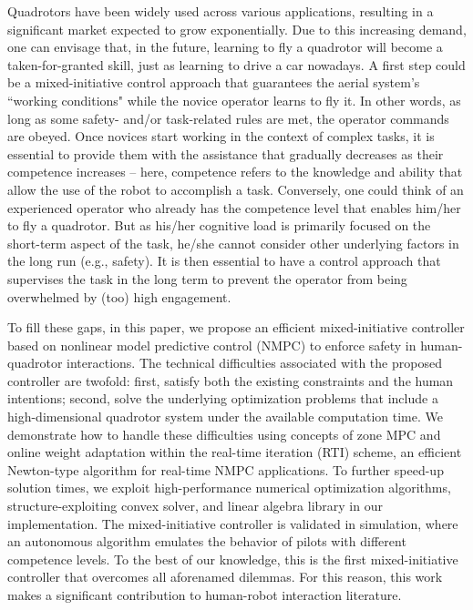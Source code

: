 Quadrotors have been widely used across various applications, resulting in a significant market expected to grow exponentially. Due to this increasing demand, one can envisage that, in the future, learning to fly a quadrotor will become a taken-for-granted skill, just as learning to drive a car nowadays. A first step could be a mixed-initiative control approach that guarantees the aerial system's ``working conditions" while the novice operator learns to fly it. In other words, as long as some safety- and/or task-related rules are met, the operator commands are obeyed. Once novices start working in the context of complex tasks, it is essential to provide them with the assistance that gradually decreases as their competence increases -- here, competence refers to the knowledge and ability that allow the use of the robot to accomplish a task. Conversely, one could think of an experienced operator who already has the competence level that enables him/her to fly a quadrotor. But as his/her cognitive load is primarily focused on the short-term aspect of the task, he/she cannot consider other underlying factors in the long run (e.g., safety). It is then essential to have a control approach that supervises the task in the long term to prevent the operator from being overwhelmed by (too) high engagement.  

To fill these gaps, in this paper, we propose an efficient mixed-initiative controller based on nonlinear model predictive control (NMPC) to enforce safety in human-quadrotor interactions. The technical difficulties associated with the proposed controller are twofold: first, satisfy both the existing constraints and the human intentions; second, solve the underlying optimization problems that include a high-dimensional quadrotor system under the available computation time. We demonstrate how to handle these difficulties using concepts of zone MPC and online weight adaptation within the real-time iteration (RTI) scheme, an efficient Newton-type algorithm for real-time NMPC applications. To further speed-up solution times, we exploit high-performance numerical optimization algorithms, structure-exploiting convex solver, and linear algebra library in our implementation. The mixed-initiative controller is validated in simulation, where an autonomous algorithm emulates the behavior of pilots with different competence levels. To the best of our knowledge, this is the first mixed-initiative controller that overcomes all aforenamed dilemmas. For this reason, this work makes a significant contribution to human-robot interaction literature.
